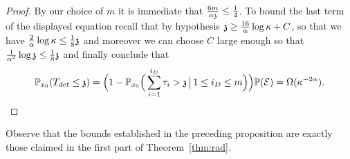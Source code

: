 \begin{proof}
By our choice of $m$ it is immediate that $\frac{6m}{\alpha\ss}\leq\frac14$. 
To bound the last term of the displayed equation recall that by hypothesis $\ss\geq\frac{16}{\alpha}\log\kappa+C$, 
so that we have $\frac{2}{\alpha}\log\kappa\le\frac18\ss$ and moreover we can choose 
$C$ large enough so that $\frac{1}{\alpha^2}\log\ss\leq\frac{1}{8}\ss$ and finally conclude that
\[%
\P_{x_0}(T_{det}\leq \ss)=\Big(1-\P_{x_0}\Big(\sum_{i=1}^{i_D}\tau_i> \ss\,\big|\,1\leq i_D\leq m\Big)\Big)\PP(\mathcal{E})=\Omega(\kappa^{-2\alpha}).
\]
\end{proof}
Observe that the bounds established in the preceding proposition are exactly those claimed in the first part of  Theorem~\ref{thm:rad}.

